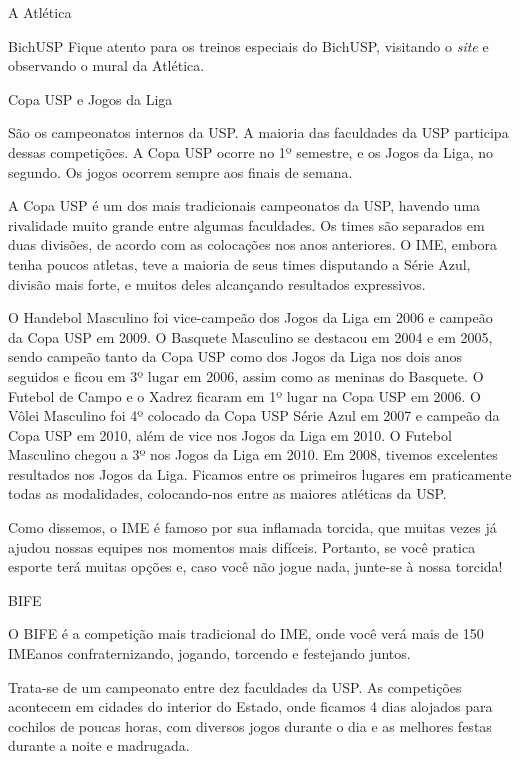 \begin{secao}{A Atlética}
\begin{subsecao}{BichUSP}
Fique atento para os treinos especiais do BichUSP, visitando o \textit{site} e
observando o mural da Atlética.

\end{subsecao}
\begin{subsecao}{Copa USP e Jogos da Liga}

São os campeonatos internos da USP. A maioria das faculdades da USP participa
dessas competições. A Copa USP ocorre no 1º semestre, e os Jogos da Liga,
no segundo. Os jogos ocorrem sempre aos finais de semana.

A Copa USP é um dos mais tradicionais campeonatos da USP, havendo uma
rivalidade muito grande entre algumas faculdades. Os times são separados em
duas divisões, de acordo com as colocações nos anos anteriores. O IME, embora
tenha poucos atletas, teve a maioria de seus times disputando a Série Azul,
divisão mais forte, e muitos deles alcançando resultados expressivos.

O Handebol Masculino foi vice-campeão dos Jogos da Liga em 2006 e campeão da
Copa USP em 2009. O Basquete Masculino se destacou em 2004 e em 2005, sendo
campeão tanto da Copa USP como dos Jogos da Liga nos dois anos seguidos e ficou
em 3º lugar em 2006, assim como as meninas do Basquete. O Futebol de
Campo e o Xadrez ficaram em 1º lugar na Copa USP em 2006. O Vôlei
Masculino foi 4º colocado da Copa USP Série Azul em 2007 e campeão da Copa
USP em 2010, além de vice nos Jogos da Liga em 2010. O Futebol Masculino chegou
a 3º nos Jogos da Liga em 2010.
Em 2008, tivemos excelentes resultados nos Jogos da Liga. Ficamos entre os
primeiros lugares em praticamente todas as modalidades, colocando-nos entre as
maiores atléticas da USP.

Como dissemos, o IME é famoso por sua inflamada torcida, que muitas vezes já
ajudou nossas equipes nos momentos mais difíceis. Portanto, se você pratica
esporte terá muitas opções e, caso você não jogue nada, junte-se à nossa torcida!

\end{subsecao}
\begin{subsecao}{BIFE}

O BIFE é a competição mais tradicional do IME, onde você verá mais de 150
IMEanos confraternizando, jogando, torcendo e festejando juntos.

Trata-se de um campeonato entre dez faculdades da USP. As competições acontecem em cidades do interior do Estado, onde ficamos 4 dias
alojados para cochilos de poucas horas, com diversos jogos durante o dia e as
melhores festas durante a noite e madrugada.


\end{subsecao}
\end{secao}
